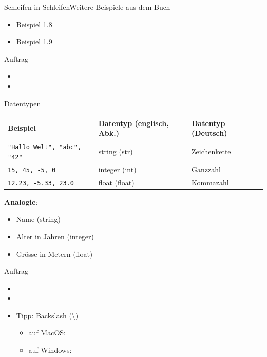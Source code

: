 \begin{frame}[fragile]{Schleifen in Schleifen}{Weitere Beispiele aus dem Buch}
	\begin{itemize}
		\item Beispiel 1.8
		\item Beispiel 1.9
	\end{itemize}
\end{frame}

\begin{frame}[fragile]{Auftrag}
	\begin{itemize}
		\item {}
		\item {}
	\end{itemize}
\end{frame}

\begin{frame}[fragile]{Datentypen}
	\begin{table}[H]
		\footnotesize
		\centering
		\begin{tabular}{l|p{2cm}|p{2cm}}
			\textbf{Beispiel}                                        & \textbf{Datentyp (englisch, Abk.)} & \textbf{Datentyp (Deutsch)} \\\midrule\midrule
			\lstinline|"Hallo Welt", "abc", "42"| & string (str)                       & Zeichenkette                \\\midrule
			\lstinline|15, 45, -5, 0|             & integer (int)                      & Ganzzahl                    \\\midrule
			\lstinline|12.23, -5.33, 23.0|        & float (float)                      & Kommazahl
		\end{tabular}
	\end{table}

	\textbf{Analogie}:
	\begin{itemize}
		\item Name (string)
		\item Alter in Jahren (integer)
		\item Grösse in Metern (float)
	\end{itemize}
\end{frame}

\begin{frame}[fragile]{Auftrag}
	\begin{itemize}
		\item {}
		\item {}
		\item Tipp: Backslash (\textbackslash)
		      \begin{itemize}
			      \item auf MacOS: 
			      \item auf Windows: \keys{\AltGr+\textbackslash}
		      \end{itemize}
	\end{itemize}
\end{frame}
